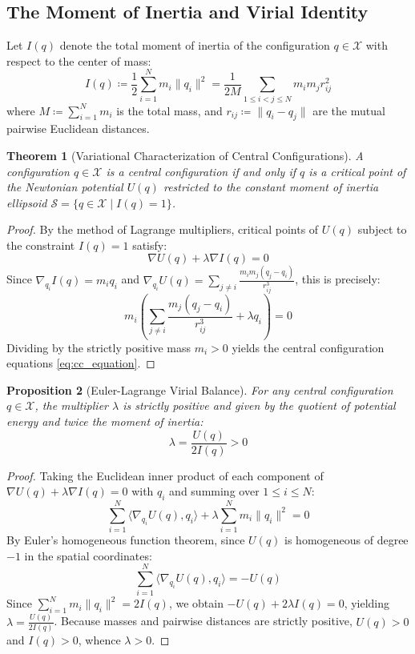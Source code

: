 \documentclass[11pt,a4paper]{article}
\newtheorem{theorem}{Theorem}[section]
\newtheorem{proposition}[theorem]{Proposition}
\theoremstyle{definition}
\begin{document}
\subsection{The Moment of Inertia and Virial Identity}

Let $I(q)$ denote the total moment of inertia of the configuration $q \in \mathcal{X}$ with respect to the center of mass:
\begin{equation}\label{eq:moment_inertia}
I(q) \coloneqq \frac{1}{2} \sum_{i=1}^N m_i \|q_i\|^2 = \frac{1}{2 M} \sum_{1 \le i < j \le N} m_i m_j r_{ij}^2
\end{equation}
where $M \coloneqq \sum_{i=1}^N m_i$ is the total mass, and $r_{ij} \coloneqq \|q_i - q_j\|$ are the mutual pairwise Euclidean distances.

\begin{theorem}[Variational Characterization of Central Configurations]\label{thm:variational_cc}
A configuration $q \in \mathcal{X}$ is a central configuration if and only if $q$ is a critical point of the Newtonian potential $U(q)$ restricted to the constant moment of inertia ellipsoid $\mathcal{S} = \{ q \in \mathcal{X} \mid I(q) = 1 \}$.
\end{theorem}

\begin{proof}
By the method of Lagrange multipliers, critical points of $U(q)$ subject to the constraint $I(q) = 1$ satisfy:
\[ \nabla U(q) + \lambda \nabla I(q) = 0 \]
Since $\nabla_{q_i} I(q) = m_i q_i$ and $\nabla_{q_i} U(q) = \sum_{j \ne i} \frac{m_i m_j (q_j - q_i)}{r_{ij}^3}$, this is precisely:
\[ m_i \left( \sum_{j \ne i} \frac{m_j (q_j - q_i)}{r_{ij}^3} + \lambda q_i \right) = 0 \]
Dividing by the strictly positive mass $m_i > 0$ yields the central configuration equations \eqref{eq:cc_equation}.
\end{proof}

\begin{proposition}[Euler-Lagrange Virial Balance]\label{prop:virial}
For any central configuration $q \in \mathcal{X}$, the multiplier $\lambda$ is strictly positive and given by the quotient of potential energy and twice the moment of inertia:
\begin{equation}\label{eq:virial_lambda}
\lambda = \frac{U(q)}{2 I(q)} > 0
\end{equation}
\end{proposition}

\begin{proof}
Taking the Euclidean inner product of each component of $\nabla U(q) + \lambda \nabla I(q) = 0$ with $q_i$ and summing over $1 \le i \le N$:
\[ \sum_{i=1}^N \langle \nabla_{q_i} U(q), q_i \rangle + \lambda \sum_{i=1}^N m_i \|q_i\|^2 = 0 \]
By Euler's homogeneous function theorem, since $U(q)$ is homogeneous of degree $-1$ in the spatial coordinates:
\[ \sum_{i=1}^N \langle \nabla_{q_i} U(q), q_i \rangle = -U(q) \]
Since $\sum_{i=1}^N m_i \|q_i\|^2 = 2 I(q)$, we obtain $-U(q) + 2 \lambda I(q) = 0$, yielding $\lambda = \frac{U(q)}{2 I(q)}$.
Because masses and pairwise distances are strictly positive, $U(q) > 0$ and $I(q) > 0$, whence $\lambda > 0$.
\end{proof}
\end{document}
